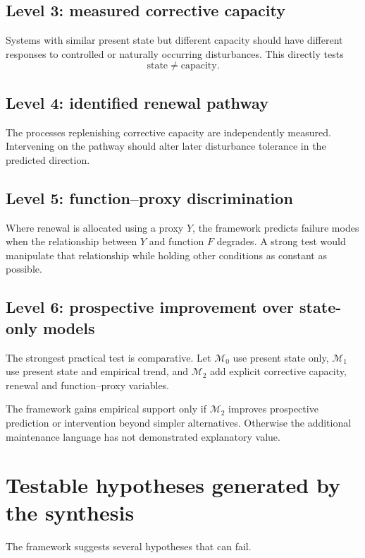 \subsection{Level 3: measured corrective capacity}

Systems with similar present state but different capacity should have different responses to controlled or naturally occurring disturbances. This directly tests
\[
\text{state}\neq\text{capacity}.
\]

\subsection{Level 4: identified renewal pathway}

The processes replenishing corrective capacity are independently measured. Intervening on the pathway should alter later disturbance tolerance in the predicted direction.

\subsection{Level 5: function--proxy discrimination}

Where renewal is allocated using a proxy \(Y\), the framework predicts failure modes when the relationship between \(Y\) and function \(F\) degrades. A strong test would manipulate that relationship while holding other conditions as constant as possible.

\subsection{Level 6: prospective improvement over state-only models}

The strongest practical test is comparative. Let \(\mathcal M_0\) use present state only, \(\mathcal M_1\) use present state and empirical trend, and \(\mathcal M_2\) add explicit corrective capacity, renewal and function--proxy variables.

The framework gains empirical support only if \(\mathcal M_2\) improves prospective prediction or intervention beyond simpler alternatives. Otherwise the additional maintenance language has not demonstrated explanatory value.

\section{Testable hypotheses generated by the synthesis}

The framework suggests several hypotheses that can fail.

